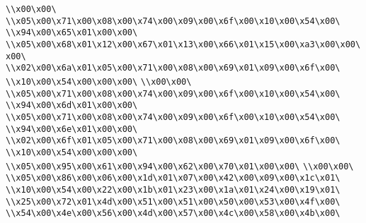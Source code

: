 \verb|\\x00\x00\|\newline
\verb|\\x05\x00\x71\x00\x08\x00\x74\x00\x09\x00\x6f\x00\x10\x00\x54\x00\|\newline
\verb|\\x94\x00\x65\x01\x00\x00\|\newline
\verb|\\x05\x00\x68\x01\x12\x00\x67\x01\x13\x00\x66\x01\x15\x00\xa3\x00\x00\x00\|\newline
\verb|\\x02\x00\x6a\x01\x05\x00\x71\x00\x08\x00\x69\x01\x09\x00\x6f\x00\|\newline
\verb|\\x10\x00\x54\x00\x00\x00\|\newline
\verb|\\x00\x00\|\newline
\verb|\\x05\x00\x71\x00\x08\x00\x74\x00\x09\x00\x6f\x00\x10\x00\x54\x00\|\newline
\verb|\\x94\x00\x6d\x01\x00\x00\|\newline
\verb|\\x05\x00\x71\x00\x08\x00\x74\x00\x09\x00\x6f\x00\x10\x00\x54\x00\|\newline
\verb|\\x94\x00\x6e\x01\x00\x00\|\newline
\verb|\\x02\x00\x6f\x01\x05\x00\x71\x00\x08\x00\x69\x01\x09\x00\x6f\x00\|\newline
\verb|\\x10\x00\x54\x00\x00\x00\|\newline
\verb|\\x05\x00\x95\x00\x61\x00\x94\x00\x62\x00\x70\x01\x00\x00\|\newline
\verb|\\x00\x00\|\newline
\verb|\\x05\x00\x86\x00\x06\x00\x1d\x01\x07\x00\x42\x00\x09\x00\x1c\x01\|\newline
\verb|\\x10\x00\x54\x00\x22\x00\x1b\x01\x23\x00\x1a\x01\x24\x00\x19\x01\|\newline
\verb|\\x25\x00\x72\x01\x4d\x00\x51\x00\x51\x00\x50\x00\x53\x00\x4f\x00\|\newline
\verb|\\x54\x00\x4e\x00\x56\x00\x4d\x00\x57\x00\x4c\x00\x58\x00\x4b\x00\|\newline
